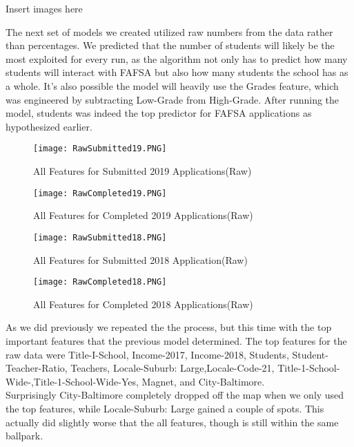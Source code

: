 \documentclass[12pt]{article}
\begin{document}
Insert images here

The next set of models we created utilized raw numbers from the data rather than percentages. We predicted that the number of students will likely be the most exploited for every run, as the algorithm not only has to predict how many students will interact with FAFSA but also how many students the school has as a whole. It's also possible the model will heavily use the Grades feature, which was engineered by subtracting Low-Grade from High-Grade. After running the model, students was indeed the top predictor for FAFSA applications as hypothesized earlier.

\begin{figure}[!htb]
  \centering
  \texttt{[image: RawSubmitted19.PNG]}
  \caption{All Features for Submitted 2019 Applications(Raw)}
  \label{fig:feature_importance}
\end{figure}

\begin{figure}[!htb]
  \centering
  \texttt{[image: RawCompleted19.PNG]}
  \caption{All Features for Completed 2019 Applications(Raw)}
  \label{fig:feature_importance}
\end{figure}

\begin{figure}[!htb]
  \centering
  \texttt{[image: RawSubmitted18.PNG]}
  \caption{All Features for Submitted 2018 Application(Raw)}
  \label{fig:feature_importance}
\end{figure}

\begin{figure}[!htb]
  \centering
  \texttt{[image: RawCompleted18.PNG]}
  \caption{All Features for Completed 2018 Applications(Raw)}
  \label{fig:feature_importance}
\end{figure}


As we did previously we repeated the the process, but this time with the top important features that the previous model determined. The top features for the raw data were Title-I-School, Income-2017, Income-2018, Students, Student-Teacher-Ratio, Teachers, Locale-Suburb: Large,Locale-Code-21, Title-1-School-Wide-,Title-1-School-Wide-Yes, Magnet, and City-Baltimore.\\

Surprisingly City-Baltimore completely dropped off the map when we only used the top features, while Locale-Suburb: Large gained a couple of spots. This actually did slightly worse that the all features, though is still within the same ballpark.
\end{document}

